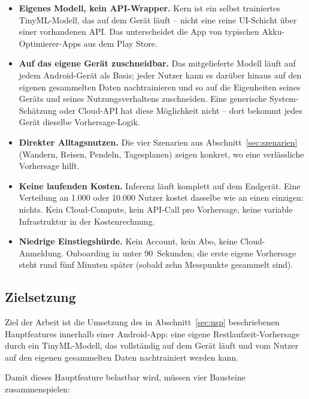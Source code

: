 \documentclass[12pt, a4paper, ngerman]{article}
\begin{document}
\begin{itemize}
\item \textbf{Eigenes Modell, kein API-Wrapper.}
  Kern ist ein selbst trainiertes TinyML-Modell, das auf dem Gerät
  läuft -- nicht eine reine UI-Schicht über einer vorhandenen API.
  Das unterscheidet die App von typischen Akku-Optimierer-Apps
  aus dem Play Store.

\item \textbf{Auf das eigene Gerät zuschneidbar.}
  Das mitgelieferte Modell läuft auf jedem Android-Gerät als Basis;
  jeder Nutzer kann es darüber hinaus auf den eigenen gesammelten
  Daten nachtrainieren und so auf die Eigenheiten seines Geräts und
  seines Nutzungsverhaltens zuschneiden. Eine generische
  System-Schätzung oder Cloud-API hat diese Möglichkeit nicht --
  dort bekommt jedes Gerät dieselbe Vorhersage-Logik.

\item \textbf{Direkter Alltagsnutzen.}
  Die vier Szenarien aus Abschnitt~\ref{sec:szenarien} (Wandern,
  Reisen, Pendeln, Tagesplanen) zeigen konkret, wo eine
  verlässliche Vorhersage hilft.

\item \textbf{Keine laufenden Kosten.}
  Inferenz läuft komplett auf dem Endgerät. Eine Verteilung an
  1.000 oder 10.000 Nutzer kostet dasselbe wie an einen einzigen:
  nichts. Kein Cloud-Compute, kein API-Call pro Vorhersage, keine
  variable Infrastruktur in der Kostenrechnung.

\item \textbf{Niedrige Einstiegshürde.}
  Kein Account, kein Abo, keine Cloud-Anmeldung. Onboarding in
  unter 90~Sekunden; die erste eigene Vorhersage steht rund fünf
  Minuten später (sobald zehn Messpunkte gesammelt sind).
\end{itemize}

\subsection{Zielsetzung}

Ziel der Arbeit ist die Umsetzung des in
Abschnitt~\ref{sec:usp} beschriebenen Hauptfeatures innerhalb
einer Android-App: eine eigene Restlaufzeit-Vorhersage durch ein
TinyML-Modell, das vollständig auf dem Gerät läuft und vom
Nutzer auf den eigenen gesammelten Daten nachtrainiert werden
kann.

Damit dieses Hauptfeature belastbar wird, müssen vier Bausteine
zusammenspielen:
\end{document}
